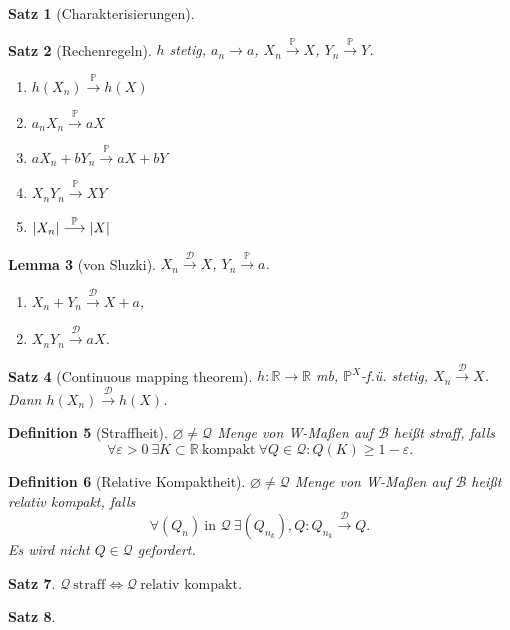 \documentclass[a4paper,8pt]{article}
\newcounter{Sec}
\theoremstyle{nonumberbreak}
\newtheorem{definition}{Definition}[Sec]
\newtheorem{satz}[definition]{Satz}
\newtheorem{lemma}[definition]{Lemma}
\renewcommand{\P}{\mathbb{P}}
\newcommand{\R}{\mathbb{R}}
\newcommand{\sk}{\mathrel{\stackrel{\P}{\longrightarrow}}}
\newcommand{\vk}{\mathrel{\stackrel{\mathcal{D}}{\longrightarrow}}}
\begin{document}
\begin{multicols*}{3}
\begin{satz}[Charakterisierungen]
\begin{enumerate}[label=(\alph*)]
		\end{enumerate}
	\end{satz}
	\begin{satz}[Rechenregeln]
		$h$ stetig, $a_n\to a$, $X_n\sk X$, $Y_n\sk Y$.
		{\setlength{\columnseprule}{0pt}\begin{multicols}{2}
		\begin{enumerate}[label=(\alph*)]
			\item $h(X_n)\sk h(X)$
			\item $a_nX_n\sk aX$
			\item $aX_n+bY_n\sk aX+bY$
			\item $X_nY_n\sk XY$
			\item $\abs{X_n}\sk\abs{X}$
		\end{enumerate}
		\end{multicols}}
	\end{satz}
	\begin{lemma}[von Sluzki]
		$X_n\vk X$, $Y_n\sk a$.
		{\setlength{\columnseprule}{0pt}\begin{multicols}{2}
		\begin{enumerate}[label=(\alph*)]
			\item $X_n+Y_n\vk X+a$,
			\item $X_nY_n\vk aX$.
		\end{enumerate}
		\end{multicols}}
	\end{lemma}
	\begin{satz}[Continuous mapping theorem]
		$h\colon\R\to\R$ mb, $\P^X$-f.ü. stetig, $X_n\vk X$. Dann $h(X_n)\vk h(X)$.
	\end{satz}
	\begin{definition}[Straffheit]
		$\varnothing\neq\mathcal{Q}$ Menge von W-Maßen auf $\mathcal{B}$ heißt straff, falls
		\[\forall\varepsilon>0~\exists K\subset\R~\text{kompakt}~\forall Q\in\mathcal{Q}:Q(K)\geq 1-\varepsilon.\]
	\end{definition}
	\begin{definition}[Relative Kompaktheit]
		$\varnothing\neq\mathcal{Q}$ Menge von W-Maßen auf $\mathcal{B}$ heißt relativ kompakt, falls
		\[\forall (Q_n)~\text{in $\mathcal{Q}$}~\exists (Q_{n_k}), Q: Q_{n_k}\vk Q.\]
		Es wird \textit{nicht} $Q\in\mathcal{Q}$ gefordert.
	\end{definition}
	\begin{satz}
		$\mathcal{Q}~\text{straff}\iff\mathcal{Q}~\text{relativ kompakt}$.
	\end{satz}
	\begin{satz}

\end{satz}
\end{multicols*}
\end{document}
